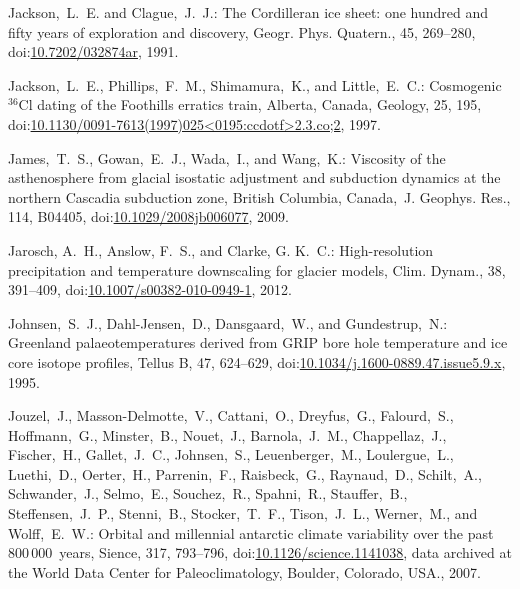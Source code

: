 \documentclass[tc, manuscript]{copernicus}
\begin{document}
\begin{thebibliography}{114}
Jackson,~L.~E. and Clague,~J.~J.: The Cordilleran ice sheet: one hundred and fifty years of exploration and discovery, G{e}ogr. Phys. Quatern., 45, 269--280,
doi:\href{http://dx.doi.org/10.7202/032874ar}{10.7202/032874ar}, 1991.


Jackson,~L.~E., Phillips,~F.~M., Shimamura,~K., and Little,~E.~C.: Cosmogenic $^{36}$Cl dating of the Foothills erratics train, Alberta, Canada, Geology, 25, 195,
doi:\href{http://dx.doi.org/10.1130/0091-7613(1997)025<0195:ccdotf>2.3.co;2}{10.1130/0091-7613(1997)025\textless0195:ccdotf\textgreater2.3.co;2}, 1997.


James,~T.~S., Gowan,~E.~J., Wada,~I., and Wang,~K.: Viscosity of the
asthenosphere from glacial isostatic adjustment and subduction dynamics at
the northern Cascadia subduction zone, British Columbia, Canada,~J. Geophys.
Res., 114, B04405,
doi:\href{http://dx.doi.org/10.1029/2008jb006077}{10.1029/2008jb006077},
2009.


Jarosch, A.~H., Anslow, F.~S., and Clarke, G. K.~C.: High-resolution precipitation and temperature downscaling for glacier models, Clim. Dynam., 38, 391--409,
doi:\href{http://dx.doi.org/10.1007/s00382-010-0949-1}{10.1007/s00382-010-0949-1}, 2012.


Johnsen,~S.~J., Dahl-Jensen,~D., Dansgaard,~W., and Gundestrup,~N.: Greenland palaeotemperatures derived from GRIP bore hole temperature and ice core isotope profiles, Tellus B, 47, 624--629,
doi:\href{http://dx.doi.org/10.1034/j.1600-0889.47.issue5.9.x}{10.1034/j.1600-0889.47.issue5.9.x}, 1995.


Jouzel,~J., Masson-Delmotte,~V., Cattani,~O., Dreyfus,~G., Falourd,~S., Hoffmann,~G., Minster,~B., Nouet,~J., Barnola,~J.~M., Chappellaz,~J., Fischer,~H., Gallet,~J.~C., Johnsen,~S., Leuenberger,~M., Loulergue,~L., Luethi,~D., Oerter,~H., Parrenin,~F., Raisbeck,~G., Raynaud,~D., Schilt,~A., Schwander,~J., Selmo,~E., Souchez,~R., Spahni,~R., Stauffer,~B., Steffensen,~J.~P., Stenni,~B., Stocker,~T.~F., Tison,~J.~L., Werner,~M., and Wolff,~E.~W.: Orbital and millennial antarctic climate variability over the past 800\,000~years, Sience, 317, 793--796,
doi:\href{http://dx.doi.org/10.1126/science.1141038}{10.1126/science.1141038}, data archived at the World Data Center for Paleoclimatology, Boulder, Colorado, USA., 2007.



\end{thebibliography}
\end{document}
